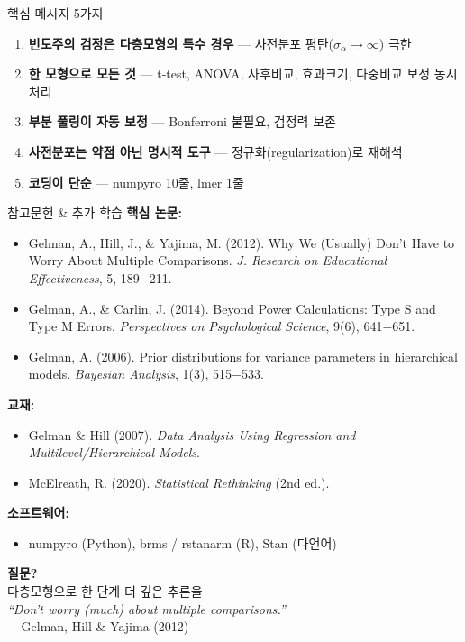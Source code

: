 \documentclass[aspectratio=169, 11pt]{beamer}
\begin{document}
\begin{frame}{핵심 메시지 5가지}
\Large
\begin{enumerate}
\item \textbf{빈도주의 검정은 다층모형의 특수 경우} — 사전분포 평탄($\sigma_\alpha \to \infty$) 극한
\vspace{0.2cm}
\item \textbf{한 모형으로 모든 것} — t-test, ANOVA, 사후비교, 효과크기, 다중비교 보정 동시 처리
\vspace{0.2cm}
\item \textbf{부분 풀링이 자동 보정} — Bonferroni 불필요, 검정력 보존
\vspace{0.2cm}
\item \textbf{사전분포는 약점 아닌 명시적 도구} — 정규화(regularization)로 재해석
\vspace{0.2cm}
\item \textbf{코딩이 단순} — numpyro 10줄, lmer 1줄
\end{enumerate}
\end{frame}

\begin{frame}{참고문헌 \& 추가 학습}
\textbf{핵심 논문:}
\begin{itemize}
\item Gelman, A., Hill, J., \& Yajima, M. (2012). Why We (Usually) Don't Have to Worry About Multiple Comparisons. \textit{J. Research on Educational Effectiveness}, 5, 189$-$211.
\item Gelman, A., \& Carlin, J. (2014). Beyond Power Calculations: Type S and Type M Errors. \textit{Perspectives on Psychological Science}, 9(6), 641$-$651.
\item Gelman, A. (2006). Prior distributions for variance parameters in hierarchical models. \textit{Bayesian Analysis}, 1(3), 515$-$533.
\end{itemize}

\textbf{교재:}
\begin{itemize}
\item Gelman \& Hill (2007). \textit{Data Analysis Using Regression and Multilevel/Hierarchical Models}.
\item McElreath, R. (2020). \textit{Statistical Rethinking} (2nd ed.).
\end{itemize}

\textbf{소프트웨어:}
\begin{itemize}
\item numpyro (Python), brms / rstanarm (R), Stan (다언어)
\end{itemize}
\end{frame}

\begin{frame}
\centering
\vfill
\Huge \textbf{질문?}\\
\vspace{1cm}
\Large 다층모형으로 한 단계 더 깊은 추론을\\
\vspace{0.5cm}
\normalsize \textit{``Don't worry (much) about multiple comparisons.''}\\
$-$ Gelman, Hill \& Yajima (2012)
\vfill
\end{frame}
\end{document}
